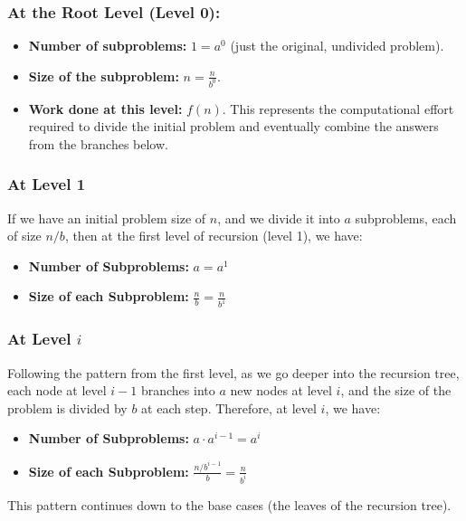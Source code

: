 \documentclass[11pt, a4paper]{article}
\begin{document}
\subsubsection*{At the Root Level (Level 0):}
\begin{itemize}
    \item \textbf{Number of subproblems:} $1 = a^0$ (just the original, undivided problem).
    \item \textbf{Size of the subproblem:} $n = \frac{n}{b^0}$.
    \item \textbf{Work done at this level:} $f(n)$. This represents the computational effort required to divide the initial problem and eventually combine the answers from the branches below.
\end{itemize}

\subsubsection*{At Level 1}
If we have an initial problem size of $n$, and we divide it into $a$ subproblems, each of size $n/b$, then at the first level of recursion (level 1), we have:
\begin{itemize}
    \item \textbf{Number of Subproblems:} $a = a^1$
    \item \textbf{Size of each Subproblem:} $\frac{n}{b} = \frac{n}{b^1}$
\end{itemize}

\subsubsection*{At Level $i$}
Following the pattern from the first level, as we go deeper into the recursion tree, each node at level $i-1$ branches into $a$ new nodes at level $i$, and the size of the problem is divided by $b$ at each step. Therefore, at level $i$, we have:
\begin{itemize}
    \item \textbf{Number of Subproblems:} $a \cdot a^{i-1} = a^i$
    \item \textbf{Size of each Subproblem:} $\frac{n/b^{i-1}}{b} = \frac{n}{b^i}$
\end{itemize}

This pattern continues down to the base cases (the leaves of the recursion tree). 
\end{document}
